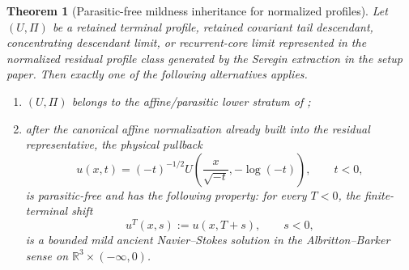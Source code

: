 \documentclass[11pt]{amsart}
\numberwithin{equation}{section}
\theoremstyle{plain}
\newtheorem{theorem}{Theorem}[section]
\theoremstyle{definition}
\theoremstyle{remark}
\begin{document}
\begin{theorem}[Parasitic-free mildness inheritance for normalized profiles]
\label{thm:mildness-inheritance-main}
Let \((U,\Pi)\) be a retained terminal profile, retained covariant tail
descendant, concentrating descendant limit, or recurrent-core limit represented in the
normalized residual profile class generated by the Seregin extraction in the
setup paper.
Then exactly one of the following alternatives applies.
\begin{enumerate}[label=\textup{(\roman*)}]
   \item \((U,\Pi)\) belongs to the affine/parasitic lower stratum of
   ;
   \item after the canonical affine normalization already built into the
   residual representative, the physical pullback
\[
   u(x,t)=(-t)^{-1/2}
   U\!\left(\frac{x}{\sqrt{-t}},-\log(-t)\right),
   \qquad t<0,
\]
is parasitic-free and has the following property: for every \(T<0\), the
finite-terminal shift
\[
   u^T(x,s):=u(x,T+s),\qquad s<0,
\]
is a bounded mild ancient Navier--Stokes solution in the Albritton--Barker
sense on \(\mathbb R^3\times(-\infty,0)\).
\end{enumerate}
\end{theorem}
\end{document}

